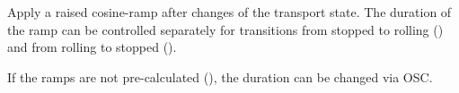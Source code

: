 Apply a raised cosine-ramp after changes of the transport state. The
duration of the ramp can be controlled separately for transitions from
stopped to rolling () and from rolling to stopped
().

If the ramps are not pre-calculated (), the
duration can be changed via OSC.



